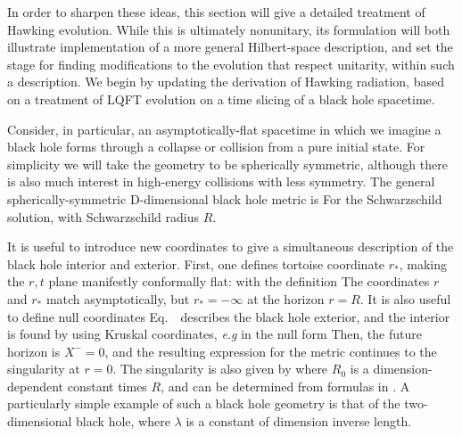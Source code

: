 
In order to sharpen these ideas,  this section will give a detailed treatment of Hawking evolution.  While this  is ultimately nonunitary\Hawkunc, its formulation will both illustrate implementation of a more general Hilbert-space description, and set the stage for finding modifications to the evolution that respect unitarity, within such a description.  We begin by updating the derivation of Hawking radiation, based on a treatment of LQFT evolution on a time slicing of a black hole spacetime.


Consider, in particular, an asymptotically-flat spacetime in which we imagine a black hole forms through a collapse or collision from a pure initial state.  For simplicity we will take the geometry to be spherically symmetric, although there is also much interest in high-energy collisions with less symmetry.  The general spherically-symmetric D-dimensional black hole metric is
%
\eqn{}
%
For the Schwarzschild solution,
%
\eqn{}
%
with Schwarzschild radius $R$. 

It is useful to introduce new coordinates to give a simultaneous description of the black hole interior and exterior.  First, one defines tortoise coordinate $r_*$, making the $r,t$ plane manifestly conformally flat:
%
\eqn{}
%
with the definition
%
\eqn{}
%
The coordinates $r$ and $r_*$ match asymptotically, but $r_*=-\infty$ at the horizon $r=R$.  It is also useful to define null coordinates
%
\eqn{}
%
Eq.~\tortmet\ describes the black hole exterior, and the interior is found by using Kruskal coordinates, {\it e.g} in the null form
%
\eqn{}
%
Then, the future horizon is $X^-=0$, and the resulting expression for the metric continues to the singularity at $r=0$.  The singularity is also given by 
%
\eqn{}
%
 where $R_0$ is a dimension-dependent constant times $R$, and can be determined from formulas in .
A particularly simple example of such a black hole geometry is that of the two-dimensional black hole,
%
\eqn{}
%
where $\lambda$ is a constant of dimension inverse length.

